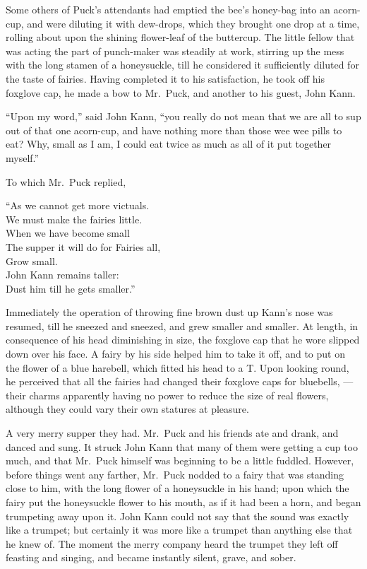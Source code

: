 \documentclass[
  12pt,
  a5paper,
  twoside]{book}
\begin{document}
Some others of Puck's attendants had emptied the bee's honey-bag into an
acorn-cup, and were diluting it with dew-drops, which they brought one
drop at a time, rolling about upon the shining flower-leaf of the
buttercup. The little fellow that was acting the part of punch-maker was
steadily at work, stirring up the mess with the long stamen of a
honeysuckle, till he considered it sufficiently diluted for the taste of
fairies. Having completed it to his satisfaction, he took off his
foxglove cap, he made a bow to Mr.~Puck, and another to his guest, John
Kann.

``Upon my word,'' said John Kann, ``you really do not mean that we are
all to sup out of that one acorn-cup, and have nothing more than those
wee wee pills to eat? Why, small as I am, I could eat twice as much as
all of it put together myself.''

To which Mr.~Puck replied,

``As we cannot get more victuals.\\
We must make the fairies little.\\
When we have become small\\
The supper it will do for Fairies all,\\
Grow small.\\
John Kann remains taller:\\
Dust him till he gets smaller.''

Immediately the operation of throwing fine brown dust up Kann's nose was
resumed, till he sneezed and sneezed, and grew smaller and smaller. At
length, in consequence of his head diminishing in size, the foxglove cap
that he wore slipped down over his face. A fairy by his side helped him
to take it off, and to put on the flower of a blue harebell, which
fitted his head to a T. Upon looking round, he perceived that all the
fairies had changed their foxglove caps for bluebells, --- their charms
apparently having no power to reduce the size of real flowers, although
they could vary their own statures at pleasure.

A very merry supper they had. Mr.~Puck and his friends ate and drank,
and danced and sung. It struck John Kann that many of them were getting
a cup too much, and that Mr.~Puck himself was beginning to be a little
fuddled. However, before things went any farther, Mr.~Puck nodded to a
fairy that was standing close to him, with the long flower of a
honeysuckle in his hand; upon which the fairy put the honeysuckle flower
to his mouth, as if it had been a horn, and began trumpeting away upon
it. John Kann could not say that the sound was exactly like a trumpet;
but certainly it was more like a trumpet than anything else that he knew
of. The moment the merry company heard the trumpet they left off
feasting and singing, and became instantly silent, grave, and sober.
\end{document}
